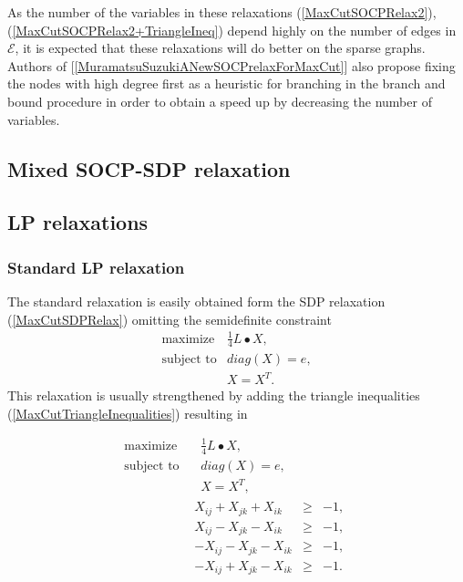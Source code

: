 \documentclass[12pt]{book}
\theoremstyle{definition}
\begin{document}
As the number of the variables in these relaxations (\ref{MaxCutSOCPRelax2}), (\ref{MaxCutSOCPRelax2+TriangleIneq}) depend highly on the number of edges in $\mathcal{E}$, it is expected that these relaxations will do better on the sparse graphs. Authors of [\ref{MuramatsuSuzukiANewSOCPrelaxForMaxCut}] also propose fixing the nodes with high degree first as a heuristic for branching in the branch and bound procedure in order to obtain a speed up by decreasing the number of variables.

\subsection{Mixed SOCP-SDP relaxation}





\subsection{LP relaxations}

\subsubsection{Standard LP relaxation}
The standard relaxation is easily obtained form the SDP relaxation (\ref{MaxCutSDPRelax}) omitting the semidefinite constraint
\begin{equation}
\label{MaxCutLPRelaxStandard}
\begin{array}{ll}
\mbox{maximize} & \frac{1}{4}L\bullet X, \\
\mbox{subject to} & diag(X) = e ,\\
&	X=X^T.
\end{array}
\end{equation} 
This relaxation is usually strengthened by adding the triangle inequalities (\ref{MaxCutTriangleInequalities}) resulting in 

\begin{equation}
\label{MaxCutSDPRelax}
\begin{array}{ll}
\mbox{maximize} & \  \ \ \ \frac{1}{4}L\bullet X, \\
\mbox{subject to} &\ \ \ \ diag(X) = e, \\
&\ \ \	\ X=X^T ,\\
& \begin{array}{rcl}
X_{ij} + X_{jk} + X_{ik} &\geq & -1, \\
X_{ij} - X_{jk} - X_{ik} &\geq & -1, \\
- X_{ij} - X_{jk} - X_{ik} &\geq & -1, \\
- X_{ij} + X_{jk} - X_{ik} &\geq & -1.
\end{array} \\
\end{array}
\end{equation} 
\end{document}
